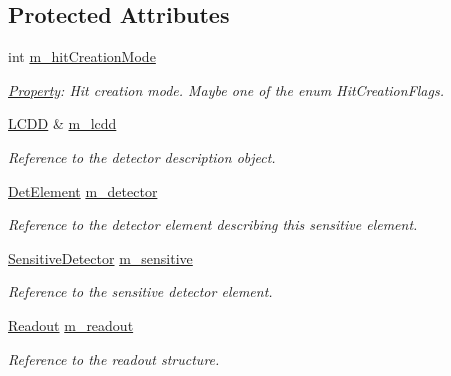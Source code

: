 \subsection*{Protected Attributes}
\begin{DoxyCompactItemize}
\item 
int \hyperlink{class_d_d4hep_1_1_simulation_1_1_geant4_sensitive_a0dca1438c83ccee54eb9458bf12220b1}{m\_\-hitCreationMode}
\begin{DoxyCompactList}\small\item\em \hyperlink{class_d_d4hep_1_1_property}{Property}: Hit creation mode. Maybe one of the enum HitCreationFlags. \item\end{DoxyCompactList}\item 
\hyperlink{class_d_d4hep_1_1_geometry_1_1_l_c_d_d}{LCDD} \& \hyperlink{class_d_d4hep_1_1_simulation_1_1_geant4_sensitive_af7bcfc4733d5822cb9d4b0852b121800}{m\_\-lcdd}
\begin{DoxyCompactList}\small\item\em Reference to the detector description object. \item\end{DoxyCompactList}\item 
\hyperlink{class_d_d4hep_1_1_geometry_1_1_det_element}{DetElement} \hyperlink{class_d_d4hep_1_1_simulation_1_1_geant4_sensitive_a8b5b7e0dff9d8fcb154b646e1618821f}{m\_\-detector}
\begin{DoxyCompactList}\small\item\em Reference to the detector element describing this sensitive element. \item\end{DoxyCompactList}\item 
\hyperlink{class_d_d4hep_1_1_geometry_1_1_sensitive_detector}{SensitiveDetector} \hyperlink{class_d_d4hep_1_1_simulation_1_1_geant4_sensitive_a02ba3b720aadf6e230b6c2c0cd258b2b}{m\_\-sensitive}
\begin{DoxyCompactList}\small\item\em Reference to the sensitive detector element. \item\end{DoxyCompactList}\item 
\hyperlink{class_d_d4hep_1_1_geometry_1_1_readout}{Readout} \hyperlink{class_d_d4hep_1_1_simulation_1_1_geant4_sensitive_a14b5d00feae681d434df04c0d9fc8f70}{m\_\-readout}
\begin{DoxyCompactList}\small\item\em Reference to the readout structure. \item\end{DoxyCompactList}\item 

\end{DoxyCompactItemize}
